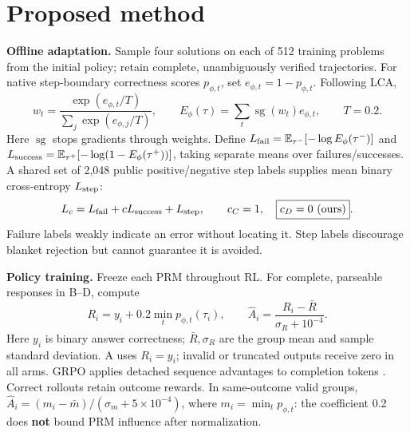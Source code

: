 \documentclass{article}
\newcommand{\E}{\mathbb{E}}
\newcommand{\sg}{\operatorname{sg}}
\begin{document}
\section{Proposed method}
\textbf{Offline adaptation.} Sample four solutions on each of 512 training problems from the initial policy; retain complete, unambiguously verified trajectories. For native step-boundary correctness scores $p_{\phi,t}$, set $e_{\phi,t}=1-p_{\phi,t}$. Following LCA,
\begin{equation}
 w_t=\frac{\exp(e_{\phi,t}/T)}{\sum_j\exp(e_{\phi,j}/T)},\qquad
 E_\phi(\tau)=\sum_t\sg(w_t)e_{\phi,t},\qquad T=0.2 .
\end{equation}
Here $\sg$ stops gradients through weights. Define $L_{\rm fail}=\E_{\tau^-}[-\log E_\phi(\tau^-)]$ and $L_{\rm success}=\E_{\tau^+}[-\log(1-E_\phi(\tau^+))]$, taking separate means over failures/successes. A shared set of 2,048 public positive/negative step labels supplies mean binary cross-entropy $L_{\rm step}$:
\begin{equation}
 L_c=L_{\rm fail}+cL_{\rm success}+L_{\rm step},\qquad
 c_C=1,\quad \boxed{c_D=0\ \text{(ours)}} .
\end{equation}
Failure labels weakly indicate an error without locating it. Step labels discourage blanket rejection but cannot guarantee it is avoided.

\newpage
\noindent\textbf{Policy training.} Freeze each PRM throughout RL. For complete, parseable responses in B--D, compute
\begin{equation}
 R_i=y_i+0.2\min_t p_{\phi,t}(\tau_i),\qquad
 \hat A_i=\frac{R_i-\bar R}{\sigma_R+10^{-4}} .
\end{equation}
Here $y_i$ is binary answer correctness; $\bar R,\sigma_R$ are the group mean and sample standard deviation. A uses $R_i=y_i$; invalid or truncated outputs receive zero in all arms. GRPO applies detached sequence advantages to completion tokens \citep{shao2024}. Correct rollouts retain outcome rewards. In same-outcome valid groups, $\hat A_i=(m_i-\bar m)/(\sigma_m+5\!\times\!10^{-4})$, where $m_i=\min_t p_{\phi,t}$: the coefficient 0.2 does \textbf{not} bound PRM influence after normalization.
\end{document}
